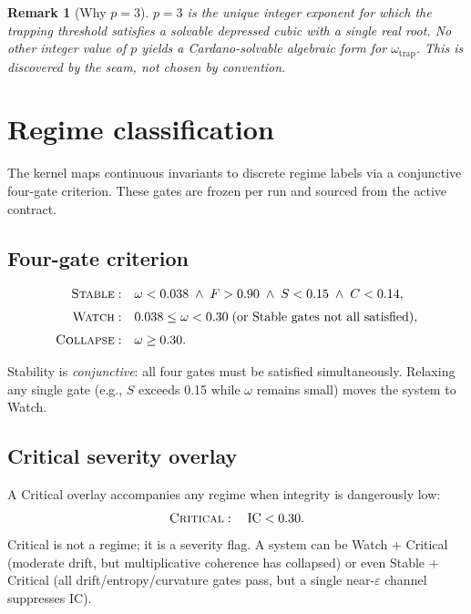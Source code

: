 \documentclass[
  aps,
  prd,
  preprint,
  superscriptaddress,
  nofootinbib,
  floatfix
]{revtex4-2}
\newcommand{\IC}{\mathrm{IC}}
\newtheorem{remark}{Remark}
\begin{document}
\begin{remark}[Why $p=3$]
$p=3$ is the unique integer exponent for which the trapping threshold satisfies a solvable depressed cubic with a single real root.
No other integer value of $p$ yields a Cardano-solvable algebraic form for $\omega_{\mathrm{trap}}$.
This is discovered by the seam, not chosen by convention.
\end{remark}

\section{Regime classification}
\label{sec:regime}

The kernel maps continuous invariants to discrete regime labels via a conjunctive four-gate criterion.
These gates are frozen per run and sourced from the active contract.

\subsection{Four-gate criterion}
\begin{equation}
\begin{aligned}
  \textsc{Stable}:\quad & \omega < 0.038 \;\wedge\; F > 0.90 \;\wedge\; S < 0.15 \;\wedge\; C < 0.14, \\[0.3em]
  \textsc{Watch}:\quad & 0.038 \le \omega < 0.30 \;\text{(or Stable gates not all satisfied)}, \\[0.3em]
  \textsc{Collapse}:\quad & \omega \ge 0.30.
\end{aligned}
\end{equation}

\noindent Stability is \emph{conjunctive}: all four gates must be satisfied simultaneously.
Relaxing any single gate (e.g., $S$ exceeds 0.15 while $\omega$ remains small) moves the system to Watch.

\subsection{Critical severity overlay}
A Critical overlay accompanies any regime when integrity is dangerously low:
\begin{equation}
  \textsc{Critical}:\quad \IC < 0.30.
\end{equation}
Critical is not a regime; it is a severity flag. A system can be Watch + Critical (moderate drift, but multiplicative
coherence has collapsed) or even Stable + Critical (all drift/entropy/curvature gates pass, but a single near-$\varepsilon$
channel suppresses $\IC$).
\end{document}
